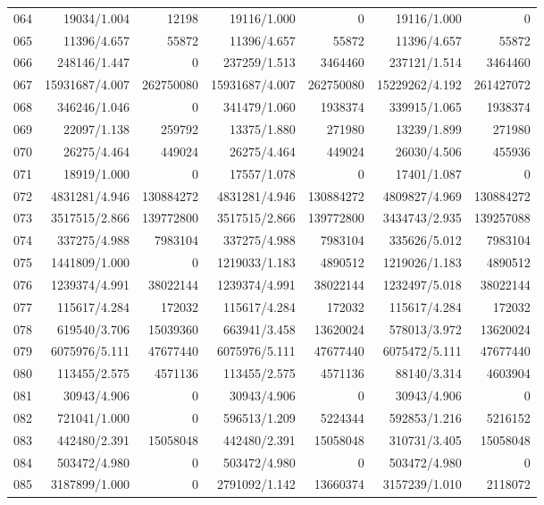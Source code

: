 \begin{longtable}{crrrrrr}
064 & 19034/1.004 & 12198 & 19116/1.000 & 0 & 19116/1.000 & 0 \\
065 & 11396/4.657 & 55872 & 11396/4.657 & 55872 & 11396/4.657 & 55872 \\
066 & 248146/1.447 & 0 & 237259/1.513 & 3464460 & 237121/1.514 & 3464460 \\
067 & 15931687/4.007 & 262750080 & 15931687/4.007 & 262750080 & 15229262/4.192 & 261427072 \\
068 & 346246/1.046 & 0 & 341479/1.060 & 1938374 & 339915/1.065 & 1938374 \\
069 & 22097/1.138 & 259792 & 13375/1.880 & 271980 & 13239/1.899 & 271980 \\
070 & 26275/4.464 & 449024 & 26275/4.464 & 449024 & 26030/4.506 & 455936 \\
071 & 18919/1.000 & 0 & 17557/1.078 & 0 & 17401/1.087 & 0 \\
072 & 4831281/4.946 & 130884272 & 4831281/4.946 & 130884272 & 4809827/4.969 & 130884272 \\
073 & 3517515/2.866 & 139772800 & 3517515/2.866 & 139772800 & 3434743/2.935 & 139257088 \\
074 & 337275/4.988 & 7983104 & 337275/4.988 & 7983104 & 335626/5.012 & 7983104 \\
075 & 1441809/1.000 & 0 & 1219033/1.183 & 4890512 & 1219026/1.183 & 4890512 \\
076 & 1239374/4.991 & 38022144 & 1239374/4.991 & 38022144 & 1232497/5.018 & 38022144 \\
077 & 115617/4.284 & 172032 & 115617/4.284 & 172032 & 115617/4.284 & 172032 \\
078 & 619540/3.706 & 15039360 & 663941/3.458 & 13620024 & 578013/3.972 & 13620024 \\
079 & 6075976/5.111 & 47677440 & 6075976/5.111 & 47677440 & 6075472/5.111 & 47677440 \\
080 & 113455/2.575 & 4571136 & 113455/2.575 & 4571136 & 88140/3.314 & 4603904 \\
081 & 30943/4.906 & 0 & 30943/4.906 & 0 & 30943/4.906 & 0 \\
082 & 721041/1.000 & 0 & 596513/1.209 & 5224344 & 592853/1.216 & 5216152 \\
083 & 442480/2.391 & 15058048 & 442480/2.391 & 15058048 & 310731/3.405 & 15058048 \\
084 & 503472/4.980 & 0 & 503472/4.980 & 0 & 503472/4.980 & 0 \\
085 & 3187899/1.000 & 0 & 2791092/1.142 & 13660374 & 3157239/1.010 & 2118072 \\

\end{longtable}

